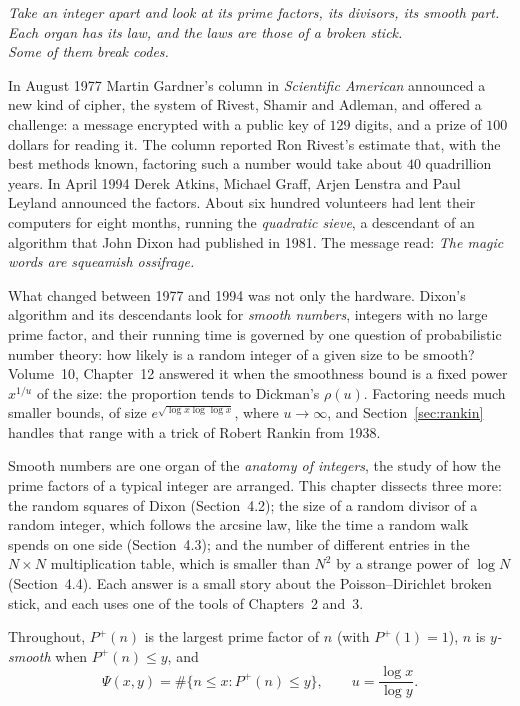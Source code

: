 \begin{center}\itshape
Take an integer apart and look at its prime factors, its divisors, its smooth part.\\
Each organ has its law, and the laws are those of a broken stick.\\
Some of them break codes.
\end{center}

In August 1977 Martin Gardner's column in \emph{Scientific American} announced a new kind of cipher, the system of Rivest, Shamir and Adleman, and offered a challenge: a message encrypted with a public key of $129$ digits, and a prize of $100$ dollars for reading it. The column reported Ron Rivest's estimate that, with the best methods known, factoring such a number would take about $40$ quadrillion years. In April 1994 Derek Atkins, Michael Graff, Arjen Lenstra and Paul Leyland announced the factors. About six hundred volunteers had lent their computers for eight months, running the \emph{quadratic sieve}, a descendant of an algorithm that John Dixon had published in 1981. The message read: \emph{The magic words are squeamish ossifrage.}

What changed between 1977 and 1994 was not only the hardware. Dixon's algorithm and its descendants look for \emph{smooth numbers}, integers with no large prime factor, and their running time is governed by one question of probabilistic number theory: how likely is a random integer of a given size to be smooth? Volume~10, Chapter~12 answered it when the smoothness bound is a fixed power $x^{1/u}$ of the size: the proportion tends to Dickman's $\rho(u)$. Factoring needs much smaller bounds, of size $e^{\sqrt{\log x\log\log x}}$, where $u\to\infty$, and Section~\ref{sec:rankin} handles that range with a trick of Robert Rankin from 1938.

Smooth numbers are one organ of the \emph{anatomy of integers}, the study of how the prime factors of a typical integer are arranged. This chapter dissects three more: the random squares of Dixon (Section~4.2); the size of a random divisor of a random integer, which follows the arcsine law, like the time a random walk spends on one side (Section~4.3); and the number of different entries in the $N\times N$ multiplication table, which is smaller than $N^2$ by a strange power of $\log N$ (Section~4.4). Each answer is a small story about the Poisson--Dirichlet broken stick, and each uses one of the tools of Chapters~2 and~3.

Throughout, $P^+(n)$ is the largest prime factor of $n$ (with $P^+(1)=1$), $n$ is \emph{$y$-smooth} when $P^+(n)\le y$, and
\[
\Psi(x,y)=\#\{n\le x:P^+(n)\le y\},\qquad u=\frac{\log x}{\log y}.
\]


